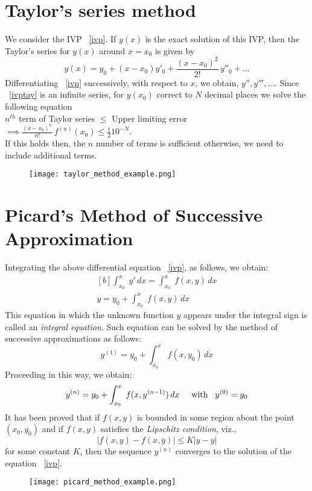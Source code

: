 \documentclass[aima203_lecturenotes_ku.tex]{subfiles}
\begin{document}
\section{Taylor's series method}
We consider the IVP ~\ref{ivp}. If $y(x)$ is the exact solution of this IVP, then the Taylor's series for $y(x)$ around $x=x_0$ is given by
\begin{equation}
  \label{ivptay}
  y(x) = y_0 + (x-x_0)y'_0 + \frac{(x-x_0)^2}{2!}\, y''_0 + ...
\end{equation}
Differentiating ~\ref{ivp} successively, with respect to $x$, we obtain, $y'', y''', ...$. Since ~\ref{ivptay} is an infinite series, for $y(x_0)$ correct to $N$ decimal places we solve the following equation \\
$n^{th}$ term of Taylor series $\leq$ Upper limiting error  $\displaystyle \implies \frac{(x-x_0)^n}{n!} \, f^{(n)} (x_0) \leq \frac{1}{2} 10^{-N}$. \\[1mm]
If this holds then, the $n$ number of terms is sufficient otherwise, we need to include additional terms.
\begin{figure}[h]
  \centering
\texttt{[image: taylor\_method\_example.png]}
\end{figure}

\section{Picard's Method of Successive Approximation}
Integrating the above differential equation ~\ref{ivp}, as follows, we obtain:
\begin{equation}
  \label{picard1}
  \begin{gathered}[b]
    \int_{x_0}^x \; y'\,dx = \int_{x_0}^x \; f(x,y)\,dx \\
      y = y_0 + \int_{x_0}^x \; f(x,y)\,dx
  \end{gathered}
\end{equation}
This equation in which the unknown function $y$ appears under the integral sign is called an \textit{integral equation}. Such equation can be solved by the method of successive approximations as follows:
\begin{equation}
  \label{picard2}
  y^{(1)} = y_0 + \int_{x_0}^x \; f(x,y_0)\,dx
\end{equation}
Proceeding in this way, we obtain:
\begin{equation}
  \label{picardit}
    y^{(n)} = y_0 + \int_{x_0}^x \; f(x,y^{(n-1)})\,dx \hspace{5mm} \text{with} \hspace{3mm}  y^{(0)} = y_0
\end{equation}
It has been proved that if $f(x,y)$ is bounded in some region about the point $(x_0, y_0)$ and if $f(x,y)$ satisfies the \textit{Lipschitz condition}, viz.,
\begin{equation*}
  |f(x,y)-f(x,\overline{y})| \leq K |y - \overline{y}|
\end{equation*}
for some constant $K$, then the sequence $y^{(n)}$ converges to the solution of the equation ~\ref{ivp}.
\begin{figure}[h]
  \centering
\texttt{[image: picard\_method\_example.png]}
\end{figure}
\end{document}

